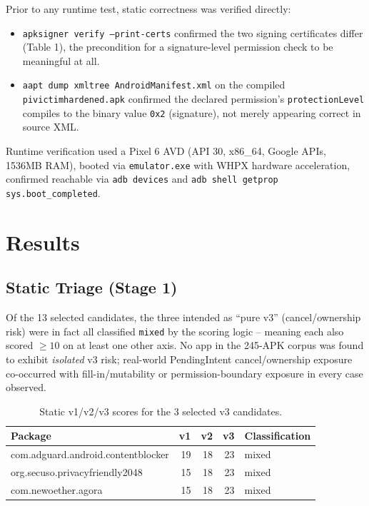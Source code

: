 \documentclass[11pt]{article}
\begin{document}
Prior to any runtime test, static correctness was verified directly:

\begin{itemize}[leftmargin=1.5em]
    \item \texttt{apksigner verify --print-certs} confirmed the two signing
    certificates differ (Table 1), the precondition for a signature-level permission
    check to be meaningful at all.
    \item \texttt{aapt dump xmltree AndroidManifest.xml} on the compiled
    \texttt{pivictimhardened.apk} confirmed the declared permission's
    \texttt{protectionLevel} compiles to the binary value \texttt{0x2} (signature),
    not merely appearing correct in source XML.
\end{itemize}

Runtime verification used a Pixel 6 AVD (API 30, x86\_64, Google APIs, 1536MB RAM),
booted via \texttt{emulator.exe} with WHPX hardware acceleration, confirmed reachable
via \texttt{adb devices} and \texttt{adb shell getprop sys.boot\_completed}.

\section{Results}

\subsection{Static Triage (Stage 1)}

Of the 13 selected candidates, the three intended as ``pure v3'' (cancel/ownership
risk) were in fact all classified \texttt{mixed} by the scoring logic -- meaning each
also scored $\geq 10$ on at least one other axis. No app in the 245-APK corpus was
found to exhibit \emph{isolated} v3 risk; real-world PendingIntent cancel/ownership
exposure co-occurred with fill-in/mutability or permission-boundary exposure in every
case observed.

\begin{table}[h]
\centering
\small
\begin{tabular}{@{}lrrrl@{}}
\toprule
\textbf{Package} & \textbf{v1} & \textbf{v2} & \textbf{v3} & \textbf{Classification} \\
\midrule
com.adguard.android.contentblocker & 19 & 18 & 23 & mixed \\
org.secuso.privacyfriendly2048 & 15 & 18 & 23 & mixed \\
com.newoether.agora & 15 & 18 & 23 & mixed \\
\bottomrule
\end{tabular}
\caption{Static v1/v2/v3 scores for the 3 selected v3 candidates.}
\end{table}
\end{document}
